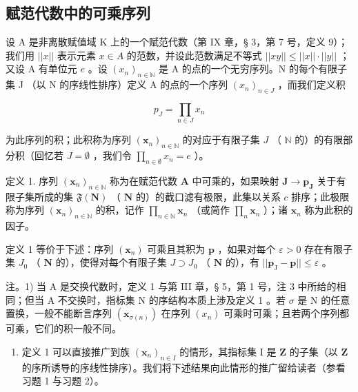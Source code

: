 \subsection{赋范代数中的可乘序列}

设 A 是非离散赋值域 K 上的一个赋范代数（第 IX 章，§ 3，第 7 号，定义 9）；我们用 \(||x||\) 表示元素 \(x \in A\) 的范数，并设此范数满足不等式 \(||xy|| \leqslant ||x|| \cdot ||y||\) ；又设 A 有单位元 \(e\) 。设 \((x_n)_{n \in \mathbb{N}}\) 是 A 的点的一个无穷序列。N 的每个有限子集 J （以 N 的序线性排序）定义 A 的点的一个序列 \((x_n)_{n \in J}\) ，而我们定义积

\[
p _ {J} = \prod_ {n \in J} x _ {n}
\]

为此序列的积；此积称为序列 \((\pmb{x}_n)_{n\in \mathbb{N}}\) 的对应于有限子集 \(J\) （ \(\mathbb{N}\) 的）的有限部分积（回忆若 \(J = \emptyset\) ，我们令 \(\prod_{n\in \emptyset}x_n = e\) ）。

定义 1. 序列 \((\pmb{x}_n)_{n\in \mathbb{N}}\) 称为在赋范代数 \(\mathbf{A}\) 中可乘的，如果映射 \(\mathbf{J}\to \pmb{p}_{\mathbf{J}}\) 关于有限子集所成的集 \(\mathfrak{F}(\mathbf{N})\) （ \(\mathbf{N}\) 的）的截口滤有极限，此集以关系 \(c\) 排序；此极限称为序列 \((\pmb{x}_n)_{n\in \mathbb{N}}\) 的积，记作 \(\prod_{n\in \mathbb{N}}\pmb{x}_n\) （或简作 \(\prod_{n}\pmb{x}_n\) ）；诸 \(\pmb{x}_n\) 称为此积的因子。

定义 1 等价于下述：序列 \((\pmb{x}_n)\) 可乘且其积为 \(\pmb{p}\) ，如果对每个 \(\varepsilon > 0\) 存在有限子集 \(J_0\) （ \(\mathbf{N}\) 的），使得对每个有限子集 \(J \supset J_0\) （ \(\mathbf{N}\) 的），有 \(||\pmb{p}_{\mathrm{J}} - \pmb{p}|| \leqslant \varepsilon\) 。

注。1) 当 A 是交换代数时，定义 1 与第 III 章，§ 5，第 1 号，注 3 中所给的相同；但当 A 不交换时，指标集 N 的序结构本质上涉及定义 1 。若 \(\sigma\) 是 N 的任意置换，一般不能断言序列 \((\pmb{x}_{\sigma(n)})\) 在序列 \((x_{n})\) 可乘时可乘；且若两个序列都可乘，它们的积一般不同。

\begin{enumerate}
\def\labelenumi{\arabic{enumi})}
\setcounter{enumi}{1}
\tightlist
\item
  定义 1 可以直接推广到族 \((\pmb{x}_n)_{n\in I}\) 的情形，其指标集 I 是 \(\mathbf{Z}\) 的子集（以 \(\mathbf{Z}\) 的序所诱导的序线性排序）。我们将下述结果向此情形的推广留给读者（参看习题 1 与习题 2）。
\end{enumerate}

